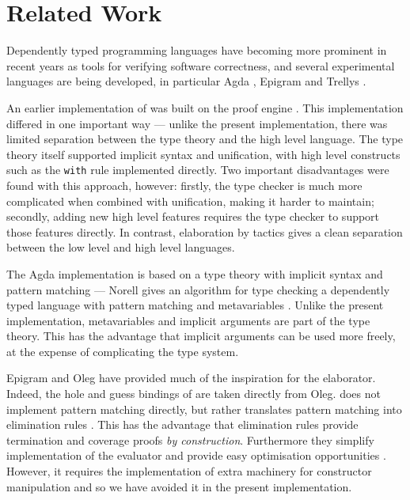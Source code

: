 \section{Related Work}

\label{sect:related}

Dependently typed programming languages have becoming more prominent in recent
years as tools for verifying software correctness, and several experimental
languages are being developed, in particular Agda \cite{norell2007thesis}, Epigram
\cite{McBride2004a,Levitation2010} and Trellys \cite{Kimmell2012}.

An earlier implementation of \Idris{} was built on the \Ivor{} proof engine 
\cite{Brady2006b}. This implementation differed in one important way --- unlike
the present implementation, there was limited separation between the type theory
and the high level language. The type theory itself supported implicit syntax and
unification, with high level constructs such as the \texttt{with} rule implemented
directly. Two important disadvantages were found with this approach, however: 
firstly, the type checker is much more complicated when combined with
unification, making it harder to maintain; secondly, adding new high level features
requires the type checker to support those features directly. In contrast, elaboration
by tactics gives a clean separation between the low level and high level languages.

The Agda implementation is based on a type theory with
implicit syntax and pattern matching --- Norell gives an algorithm for type checking
a dependently typed language with pattern matching and metavariables 
\cite{norell2007thesis}. Unlike the present \Idris{} implementation, metavariables
and implicit arguments are part of the type theory. This has the advantage that
implicit arguments can be used more freely, at the expense of complicating the type
system.

Epigram \cite{McBride2004a} and Oleg \cite{McBride1999} 
have provided much of the inspiration for the \Idris{} elaborator. Indeed,
the hole and guess bindings of \TTdev{} are taken directly from Oleg.
\Epigram{} does not implement pattern matching directly, but rather translates
pattern matching into elimination rules \cite{McBride2002}. This has the
advantage that
elimination rules provide termination and coverage proofs \emph{by construction}.
Furthermore they simplify implementation of the evaluator and provide easy
optimisation opportunities \cite{Brady2003}. However, it requires the
implementation of extra machinery for constructor manipulation
\cite{McBride2006} and so we have avoided it in the present implementation.


